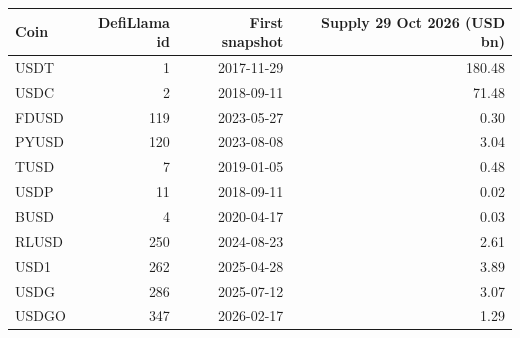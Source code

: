 \begin{tabular}{lrrr}
\toprule
Coin & DefiLlama id & First snapshot & Supply 29 Oct 2026 (USD bn) \\
\midrule
USDT & 1 & 2017-11-29 & 180.48 \\
USDC & 2 & 2018-09-11 & 71.48 \\
FDUSD & 119 & 2023-05-27 & 0.30 \\
PYUSD & 120 & 2023-08-08 & 3.04 \\
TUSD & 7 & 2019-01-05 & 0.48 \\
USDP & 11 & 2018-09-11 & 0.02 \\
BUSD & 4 & 2020-04-17 & 0.03 \\
RLUSD & 250 & 2024-08-23 & 2.61 \\
USD1 & 262 & 2025-04-28 & 3.89 \\
USDG & 286 & 2025-07-12 & 3.07 \\
USDGO & 347 & 2026-02-17 & 1.29 \\
\bottomrule
\end{tabular}
